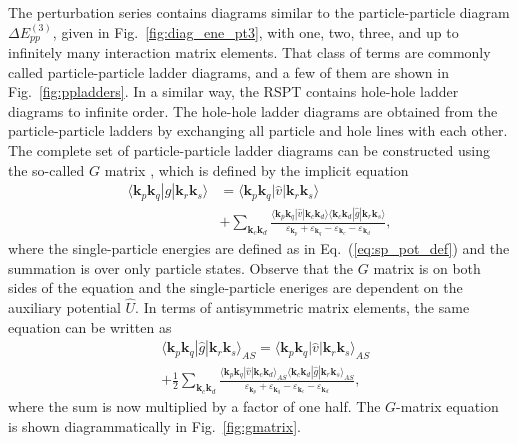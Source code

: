\documentclass[a4paper,12pt]{report}
\begin{document}
The perturbation series contains diagrams similar to the particle-particle diagram $\Delta E_{pp}^{(3)}$, given in Fig.~\ref{fig:diag_ene_pt3}, with one, two, three, and up to infinitely many interaction matrix elements. That class of terms are commonly called particle-particle ladder diagrams, and a few of them are shown in Fig.~\ref{fig:ppladders}. In a similar way, the RSPT contains hole-hole ladder diagrams to infinite order. The hole-hole ladder diagrams are obtained from the particle-particle ladders by exchanging all particle and hole lines with each other. The complete set of particle-particle ladder diagrams can be constructed using the so-called $G$ matrix \cite{brueckner_levinson}, which is defined by the implicit equation
 \begin{align}
   \langle \mathbf{k}_{p}\mathbf{k}_{q}|\hat{g}|\mathbf{k}_{r}\mathbf{k}_{s}\rangle &= \langle \mathbf{k}_{p}\mathbf{k}_{q}|\hat{v}|\mathbf{k}_{r}\mathbf{k}_{s}\rangle \nonumber \\
     &+ \sum_{\mathbf{k}_{c}\mathbf{k}_{d}}\frac{\langle \mathbf{k}_{p}\mathbf{k}_{q}|\hat{v}|\mathbf{k}_{c}\mathbf{k}_{d}\rangle \langle \mathbf{k}_{c}\mathbf{k}_{d}|\hat{g}|\mathbf{k}_{r}\mathbf{k}_{s}\rangle }{\varepsilon_{\mathbf{k}_{p}}+\varepsilon_{\mathbf{k}_{q}}-\varepsilon_{\mathbf{k}_{c}}-\varepsilon_{\mathbf{k}_{d}}},
   \label{eq:gmat1}
 \end{align}
where the single-particle energies are defined as in Eq.~(\ref{eq:sp_pot_def}) and the summation is over only particle states. Observe that the $G$ matrix is on both sides of the equation and the single-particle eneriges are dependent on the auxiliary potential $\hat{U}$. In terms of antisymmetric matrix elements, the same equation can be written as
\begin{align} 
  &\langle \mathbf{k}_{p}\mathbf{k}_{q}|\hat{g}|\mathbf{k}_{r}\mathbf{k}_{s}\rangle_{AS} = \langle \mathbf{k}_{p}\mathbf{k}_{q}|\hat{v}|\mathbf{k}_{r}\mathbf{k}_{s}\rangle_{AS} \nonumber \\
  &+ \frac{1}{2}\sum_{\mathbf{k}_{c}\mathbf{k}_{d}}\frac{\langle \mathbf{k}_{p}\mathbf{k}_{q}|\hat{v}|\mathbf{k}_{c}\mathbf{k}_{d}\rangle_{AS}\langle \mathbf{k}_{c}\mathbf{k}_{d}|\hat{g}|\mathbf{k}_{r}\mathbf{k}_{s}\rangle_{AS}}{\varepsilon_{\mathbf{k}_{p}}+\varepsilon_{\mathbf{k}_{q}}-\varepsilon_{\mathbf{k}_{c}}-\varepsilon_{\mathbf{k}_{d}}},
  \label{eq:gmatrix_as}
\end{align}
where the sum is now multiplied by a factor of one half. The $G$-matrix equation is shown diagrammatically in Fig.~\ref{fig:gmatrix}.
\end{document}
